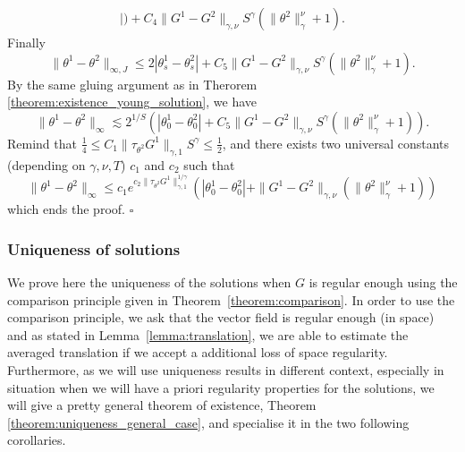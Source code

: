 \documentclass[a4paper,11pt]{article}
\newenvironment{proof}{{\sc Proof.}}{\hfill$\square$}
\begin{document}
\begin{proof}
\begin{eqnarray*}
    | ) +C_{4} \| G^{1} -G^{2} \|_{\gamma , \nu} S^{\gamma} ( \| \theta^{2}
    \|^{\nu}_{\gamma} +1 ) .
  \end{eqnarray*}
  Finally
  \[ \| \theta^{1} - \theta^{2} \|_{\infty ,J} \leqslant 2 | \theta^{1}_{s} -
     \theta^{2}_{s} | +C_{5} \| G^{1} -G^{2} \|_{\gamma , \nu} S^{\gamma} ( \|
     \theta^{2} \|^{\nu}_{\gamma} +1 ) . \]
  By the same gluing argument as in Therorem
  \ref{theorem:existence_young_solution}, we have
  \[ \| \theta^{1} - \theta^{2} \|_{\infty} \lesssim 2^{1/S} ( |
     \theta^{1}_{0} - \theta^{2}_{0} | +C_{5} \| G^{1} -G^{2} \|_{\gamma ,
     \nu} S^{\gamma} ( \| \theta^{2} \|^{\nu}_{\gamma} +1 ) ) . \]
  Remind that $\frac{1}{4} \leqslant C_{1} \| \tau_{\theta^{2}} G^{1}
  \|_{\gamma ,1} S^{\gamma} \leqslant \frac{1}{2}$, and there exists two
  universal constants (depending on $\gamma , \nu ,T$) $c_{1}$ and $c_{2}$
  such that
  \[ \| \theta^{1} - \theta^{2} \|_{\infty} \leqslant c_{1} e^{c_{2} \|
     \tau_{\theta^{2}} G^{1} \|_{\gamma ,1}^{1/ \gamma}} ( | \theta^{1}_{0} -
     \theta^{2}_{0} | + \| G^{1} -G^{2} \|_{\gamma , \nu} ( \| \theta^{2}
     \|^{\nu}_{\gamma} +1 ) ) \]
  which ends the proof.
\end{proof}

\subsubsection{Uniqueness of solutions}

We prove here the uniqueness of the solutions when $G$ is regular enough using
the comparison principle given in Theorem~\ref{theorem:comparison}. In order
to use the comparison principle, we ask that the vector field is regular
enough (in space) and as stated in Lemma~\ref{lemma:translation}, we are able
to estimate the averaged translation if we accept a additional loss of space
regularity. Furthermore, as we will use uniqueness results in different
context, especially in situation when we will have a priori regularity
properties for the solutions, we will give a pretty general theorem of
existence, Theorem \ref{theorem:uniqueness_general_case}, and specialise it in
the two following corollaries.
\end{document}
